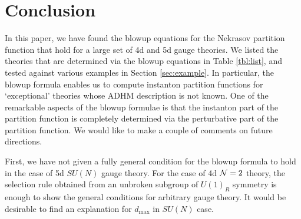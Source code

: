 \documentclass[letterpaper, 11pt]{article}
\def\CN{{\cal N}}
\begin{document}
{%




\section{Conclusion} \label{sec:conclusion}

In this paper, we have found the blowup equations for the Nekrasov partition function that hold for a large set of 4d and 5d gauge theories. 
We listed the theories that are determined via the blowup equations in Table \ref{tbl:list}, and tested against various examples in Section \ref{sec:example}. In particular, the blowup formula enables us to compute instanton partition functions for `exceptional' theories whose ADHM description is not known. 
One of the remarkable aspects of the blowup formulae is that the instanton part of the partition function is completely determined via the perturbative part of the partition function. We would like to make a couple of comments on future directions. 

First, we have not given a fully general condition for the blowup formula to hold in the case of 5d $SU(N)$ gauge theory. For the case of 4d $\CN=2$ theory, the selection rule obtained from an unbroken subgroup of $U(1)_R$ symmetry is enough to show the general conditions for arbitrary gauge theory. It would be desirable to find an explanation  for $d_{\text{max}}$ in $SU(N)$ case. 

}
\end{document}
